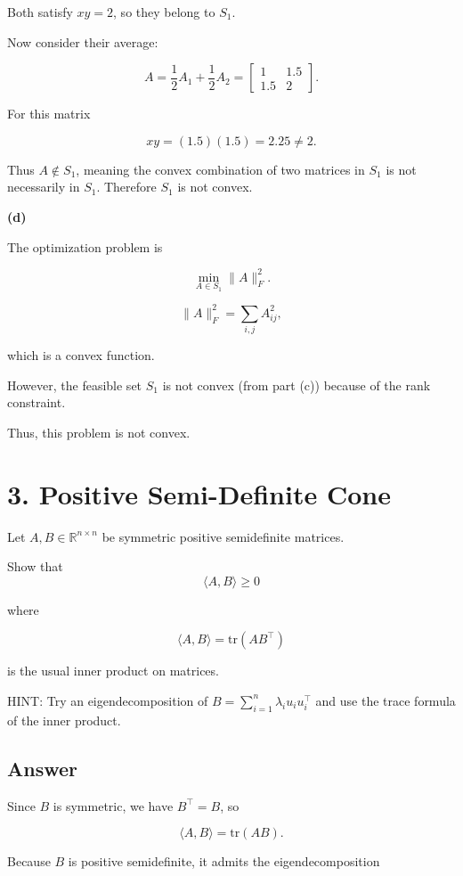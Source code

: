\documentclass[
  12pt,
]{fphw}
\begin{document}
Both satisfy $xy = 2$, so they belong to $S_1$.

Now consider their average:

\[
A = \frac{1}{2}A_1 + \frac{1}{2}A_2
=
\begin{bmatrix}
1 & 1.5 \\
1.5 & 2
\end{bmatrix}.
\]

For this matrix

\[
xy = (1.5)(1.5) = 2.25 \neq 2.
\]

Thus $A \notin S_1$, meaning the convex combination of two matrices in $S_1$ is not necessarily in $S_1$. Therefore $S_1$ is not convex.

\textbf{(d)}

The optimization problem is

\[
\min_{A \in S_1} \|A\|_F^2.
\]

\[
\|A\|_F^2 = \sum_{i,j} A_{ij}^2,
\]

which is a convex function.

However, the feasible set $S_1$ is not convex (from part (c)) because of the rank constraint.

Thus, this  problem is not convex.

\newpage
\section*{3. Positive Semi-Definite Cone}

Let $A,B\in\mathbb{R}^{n\times n}$ be symmetric positive semidefinite matrices.

Show that
\[
\langle A,B\rangle \ge 0
\]

where

\[
\langle A,B\rangle = \mathrm{tr}(AB^\top)
\]

is the usual inner product on matrices.

HINT: Try an eigendecomposition of
$
B=\sum_{i=1}^n \lambda_i u_i u_i^\top
$
and use the trace formula of the inner product.

\subsection*{Answer}


Since $B$ is symmetric, we have $B^\top = B$, so

\[
\langle A,B\rangle = \mathrm{tr}(AB).
\]

Because $B$ is positive semidefinite, it admits the eigendecomposition
\end{document}

